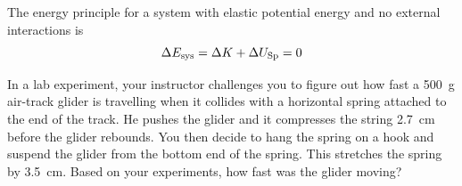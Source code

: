 The energy principle for a system with elastic potential energy and no
external interactions is
\begin{equation}
    \Delta E_{\mathrm{sys}} = \Delta K + \Delta U_\mathrm{Sp} = 0
\end{equation}

\begin{Exercise}[title={An air-track glider compresses a string}]
    In a lab experiment, your instructor challenges you to figure out
    how fast a \SI{500}{\gram} air-track glider is travelling when it
    collides with a horizontal spring attached to the end of the track.
    He pushes the glider and it compresses the string \SI{2.7}{\centi\metre}
    before the glider rebounds.  You then decide to hang the spring on a
    hook and suspend the glider from the bottom end of the spring.  This
    stretches the spring by \SI{3.5}{\centi\metre}.  Based on your
    experiments, how fast was the glider moving?
\end{Exercise}
